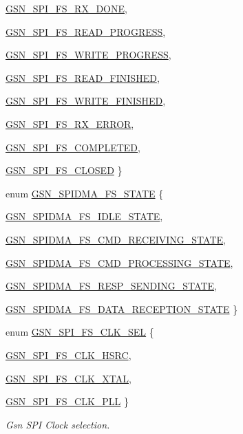 \begin{DoxyCompactItemize}
\par
\hyperlink{a00589_a0e734f119d784afd32b10d30c8cca2f6a78fcd6eb7deba2f81aaeca56ca72b029}{GSN\_\-SPI\_\-FS\_\-RX\_\-DONE}, 
\par
\hyperlink{a00589_a0e734f119d784afd32b10d30c8cca2f6aef70ebe744f89e3a21c3212b129cd078}{GSN\_\-SPI\_\-FS\_\-READ\_\-PROGRESS}, 
\par
\hyperlink{a00589_a0e734f119d784afd32b10d30c8cca2f6a4352aa3c56b67c74e6a704540cc6ac3c}{GSN\_\-SPI\_\-FS\_\-WRITE\_\-PROGRESS}, 
\par
\hyperlink{a00589_a0e734f119d784afd32b10d30c8cca2f6a3288631007e12bdc8d8e824e9223bf87}{GSN\_\-SPI\_\-FS\_\-READ\_\-FINISHED}, 
\par
\hyperlink{a00589_a0e734f119d784afd32b10d30c8cca2f6a53403175c81e4fecea184cf5c780aa84}{GSN\_\-SPI\_\-FS\_\-WRITE\_\-FINISHED}, 
\par
\hyperlink{a00589_a0e734f119d784afd32b10d30c8cca2f6ac21bb5d102245828e888a891eee497e0}{GSN\_\-SPI\_\-FS\_\-RX\_\-ERROR}, 
\par
\hyperlink{a00589_a0e734f119d784afd32b10d30c8cca2f6a15f75db85f218ff12fe148a0b5399ce5}{GSN\_\-SPI\_\-FS\_\-COMPLETED}, 
\par
\hyperlink{a00589_a0e734f119d784afd32b10d30c8cca2f6a3b520cbf6665fb1e85d520f207ca682a}{GSN\_\-SPI\_\-FS\_\-CLOSED}
 \}
\item 
enum \hyperlink{a00589_a7973ccf42e6a96d49b30b0b901842bb4}{GSN\_\-SPIDMA\_\-FS\_\-STATE} \{ \par
\hyperlink{a00589_a7973ccf42e6a96d49b30b0b901842bb4aec620b958f3e340ba17c32cb761ac1e0}{GSN\_\-SPIDMA\_\-FS\_\-IDLE\_\-STATE}, 
\par
\hyperlink{a00589_a7973ccf42e6a96d49b30b0b901842bb4a2307757ed507eba794c119ff5b86e139}{GSN\_\-SPIDMA\_\-FS\_\-CMD\_\-RECEIVING\_\-STATE}, 
\par
\hyperlink{a00589_a7973ccf42e6a96d49b30b0b901842bb4a211753bd8a6293d644db3cb2b9047f20}{GSN\_\-SPIDMA\_\-FS\_\-CMD\_\-PROCESSING\_\-STATE}, 
\par
\hyperlink{a00589_a7973ccf42e6a96d49b30b0b901842bb4a1bafc72caa90ae1b8fb0b89eff256e46}{GSN\_\-SPIDMA\_\-FS\_\-RESP\_\-SENDING\_\-STATE}, 
\par
\hyperlink{a00589_a7973ccf42e6a96d49b30b0b901842bb4a1f7306bc4fdbeeff8c530baad730204d}{GSN\_\-SPIDMA\_\-FS\_\-DATA\_\-RECEPTION\_\-STATE}
 \}
\item 
enum \hyperlink{a00655_ga19874fb33d92ef82cb6a517ba6c1a5fa}{GSN\_\-SPI\_\-FS\_\-CLK\_\-SEL} \{ \par
\hyperlink{a00655_gga19874fb33d92ef82cb6a517ba6c1a5faacc5c98717a8aeb83de93e0b25c489bad}{GSN\_\-SPI\_\-FS\_\-CLK\_\-HSRC}, 
\par
\hyperlink{a00655_gga19874fb33d92ef82cb6a517ba6c1a5faadc9477dfa579313fc3c66e6fb1e7b831}{GSN\_\-SPI\_\-FS\_\-CLK\_\-XTAL}, 
\par
\hyperlink{a00655_gga19874fb33d92ef82cb6a517ba6c1a5faadeae39953a2fe0202f1c5357faccbe3d}{GSN\_\-SPI\_\-FS\_\-CLK\_\-PLL}
 \}
\begin{DoxyCompactList}\small\item\em Gsn SPI Clock selection. \end{DoxyCompactList}\end{DoxyCompactItemize}
